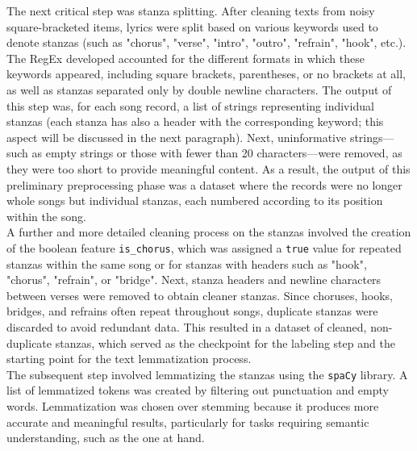 The next critical step was stanza splitting. After cleaning texts from
noisy square-bracketed items, lyrics were split based on various keywords
used to denote stanzas (such as "chorus", "verse", "intro", "outro", "refrain", "hook", etc.).
The RegEx developed accounted for the different formats in which these keywords
appeared, including square brackets, parentheses, or no brackets at all, as well
as stanzas separated only by double newline characters.
The output of this step was, for each song record, a list of strings
representing individual stanzas (each stanza has also a header with the corresponding
keyword; this aspect will be discussed in the next paragraph).
Next, uninformative strings—such as empty strings or those with fewer
than 20 characters—were removed, as they were too short to provide meaningful
content.
As a result, the output of this preliminary preprocessing phase was a dataset
where the records were no longer whole songs but individual stanzas, each
numbered according to its position within the song.\\

A further and more detailed cleaning process on the stanzas involved the creation
of the boolean feature \texttt{is\_chorus}, which was assigned a \texttt{true}
value for repeated stanzas within the same song or for stanzas with headers such
as "hook", "chorus", "refrain", or "bridge".
Next, stanza headers and newline characters between verses were removed to obtain
cleaner stanzas.
Since choruses, hooks, bridges, and refrains often repeat throughout songs,
duplicate stanzas were discarded to avoid redundant data. This resulted in a
dataset of cleaned, non-duplicate stanzas, which served as the checkpoint for
the labeling step and the starting point for the text lemmatization process.\\

The subsequent step involved lemmatizing the stanzas using the \texttt{spaCy}
library. A list of lemmatized tokens was created by filtering out punctuation
and empty words. Lemmatization was chosen over stemming because it produces
more accurate and meaningful results, particularly for tasks requiring semantic
understanding, such as the one at hand.\\

